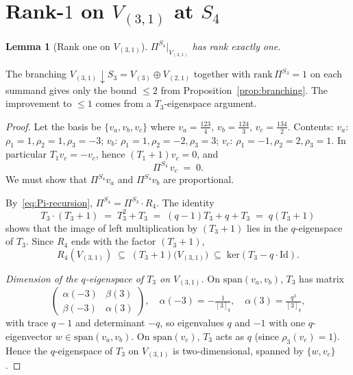 \documentclass[11pt]{article}
\newtheorem{lemma}[theorem]{Lemma}
\theoremstyle{definition}
\newcommand{\Pis}[1]{\Pi^{S_{#1}}}
\begin{document}
\section{Rank-$1$ on $V_{(3,1)}$ at $S_4$}\label{sec:V31}

\begin{lemma}[Rank one on $V_{(3,1)}$]\label{lem:V31}
$\Pis{4}\big|_{V_{(3,1)}}$ has rank exactly one.
\end{lemma}

The branching $V_{(3,1)}{\downarrow}S_3 = V_{(3)} \oplus V_{(2,1)}$ together
with $\mathrm{rank}\,\Pis{3} = 1$ on each summand gives only the bound
$\le 2$ from Proposition~\ref{prop:branching}. The improvement to $\le 1$
comes from a $T_3$-eigenspace argument.

\begin{proof}
Let the basis be $\{v_a, v_b, v_c\}$ where
$v_a = \tfrac{123}{4}$, $v_b = \tfrac{124}{3}$, $v_c = \tfrac{134}{2}$.
Contents:
$v_a$: $\rho_1=1, \rho_2=1, \rho_3=-3$;
$v_b$: $\rho_1=1, \rho_2=-2, \rho_3=3$;
$v_c$: $\rho_1=-1, \rho_2=2, \rho_3=1$.
In particular $T_1 v_c = -v_c$, hence $(T_1+1)v_c = 0$, and
\begin{equation}\label{eq:Pi-vc-zero}
\Pis{4}\, v_c \;=\; 0.
\end{equation}
We must show that $\Pis{4} v_a$ and $\Pis{4} v_b$ are proportional.

By~\eqref{eq:Pi-recursion}, $\Pis{4} = \Pis{3}\cdot R_4$. The identity
\[
T_3 \cdot (T_3+1) \;=\; T_3^2 + T_3 \;=\; (q-1)T_3 + q + T_3 \;=\; q(T_3+1)
\]
shows that the image of left multiplication by $(T_3+1)$ lies in the
$q$-eigenspace of $T_3$. Since $R_4$ ends with the factor $(T_3+1)$,
\begin{equation}\label{eq:R4-image}
R_4(V_{(3,1)}) \;\subseteq\; (T_3+1)\bigl(V_{(3,1)}\bigr)
  \;\subseteq\; \mathrm{ker}(T_3 - q\cdot \mathrm{Id}).
\end{equation}

\emph{Dimension of the $q$-eigenspace of $T_3$ on $V_{(3,1)}$.}
On $\mathrm{span}(v_a, v_b)$, $T_3$ has matrix
\[
\begin{pmatrix} \alpha(-3) & \beta(3) \\ \beta(-3) & \alpha(3) \end{pmatrix},
\quad \alpha(-3) = -\tfrac{1}{[3]_q}, \quad \alpha(3) = \tfrac{q^3}{[3]_q},
\]
with trace $q-1$ and determinant $-q$, so eigenvalues $q$ and $-1$
with one $q$-eigenvector $w \in \mathrm{span}(v_a, v_b)$. On
$\mathrm{span}(v_c)$, $T_3$ acts as $q$ (since $\rho_3(v_c) = 1$).
Hence the $q$-eigenspace of $T_3$ on $V_{(3,1)}$ is two-dimensional,
spanned by $\{w, v_c\}$.


\end{proof}
\end{document}
